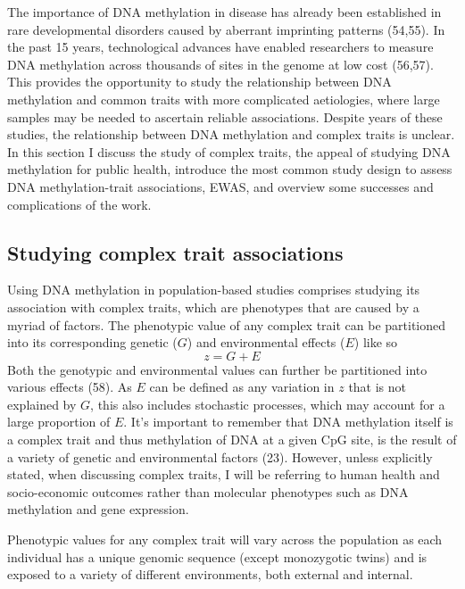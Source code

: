 \documentclass[11pt,oneside]{bristolthesis}
\begin{document}
The importance of DNA methylation in disease has already been established in rare developmental disorders caused by aberrant imprinting patterns (54,55). In the past 15 years, technological advances have enabled researchers to measure DNA methylation across thousands of sites in the genome at low cost (56,57). This provides the opportunity to study the relationship between DNA methylation and common traits with more complicated aetiologies, where large samples may be needed to ascertain reliable associations. Despite years of these studies, the relationship between DNA methylation and complex traits is unclear. In this section I discuss the study of complex traits, the appeal of studying DNA methylation for public health, introduce the most common study design to assess DNA methylation-trait associations, EWAS, and overview some successes and complications of the work.

\hypertarget{studying-complex-trait-associations}{%
\subsection{Studying complex trait associations}\label{studying-complex-trait-associations}}

Using DNA methylation in population-based studies comprises studying its association with complex traits, which are phenotypes that are caused by a myriad of factors. The phenotypic value of any complex trait can be partitioned into its corresponding genetic (\(G\)) and environmental effects (\(E\)) like so
\begin{equation}
    z = G + E
    \label{eq:phenotypic-values}
\end{equation}
Both the genotypic and environmental values can further be partitioned into various effects (58). As \(E\) can be defined as any variation in \(z\) that is not explained by \(G\), this also includes stochastic processes, which may account for a large proportion of \(E\). It's important to remember that DNA methylation itself is a complex trait and thus methylation of DNA at a given CpG site, is the result of a variety of genetic and environmental factors (23). However, unless explicitly stated, when discussing complex traits, I will be referring to human health and socio-economic outcomes rather than molecular phenotypes such as DNA methylation and gene expression.

Phenotypic values for any complex trait will vary across the population as each individual has a unique genomic sequence (except monozygotic twins) and is exposed to a variety of different environments, both external and internal.
\end{document}
